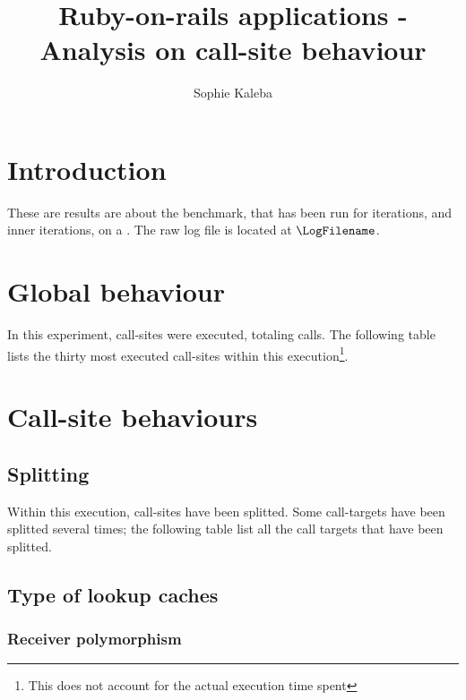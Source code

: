 \documentclass[preprint]{acmart}
\begin{document}
\title{Ruby-on-rails applications - Analysis on call-site behaviour}

\author{Sophie Kaleba}

\maketitle

\section{Introduction}

These are results are about the \BenchmarkName benchmark, that has been run for \NumIterations iterations, and \NumInnerIterations inner iterations, on a \Hihaho.
The raw log file is located at $\LogFilename$. 

\section{Global behaviour}

In this experiment, \NumberCallSites call-sites were executed, totaling \NumberCalls calls.  
The following table lists the thirty most executed call-sites within this execution\footnote{This does not account for the actual execution time spent}.

\MostExecutedCallSite

\section{Call-site behaviours}

\subsection{Splitting}

Within this execution, \NumOfSplittedTargets call-sites have been splitted.
Some call-targets have been splitted several times; the following table list all the call targets that have been splitted.

\newpage

\Splitting

\subsection{Type of lookup caches}

\subsubsection{Receiver polymorphism}
\end{document}
